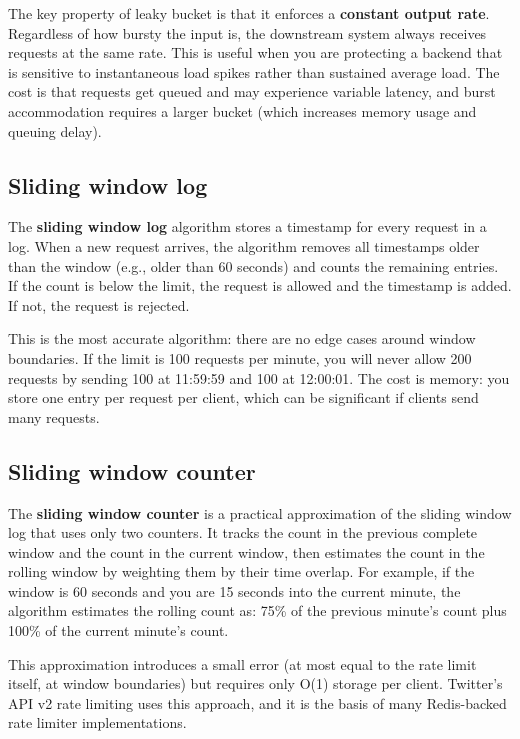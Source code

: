 \documentclass[11pt,a4paper]{article}
\begin{document}
The key property of leaky bucket is that it enforces a \textbf{constant output rate}. Regardless of how bursty the input is, the downstream system always receives requests at the same rate. This is useful when you are protecting a backend that is sensitive to instantaneous load spikes rather than sustained average load. The cost is that requests get queued and may experience variable latency, and burst accommodation requires a larger bucket (which increases memory usage and queuing delay).

\subsection{Sliding window log}

The \textbf{sliding window log} algorithm stores a timestamp for every request in a log. When a new request arrives, the algorithm removes all timestamps older than the window (e.g., older than 60 seconds) and counts the remaining entries. If the count is below the limit, the request is allowed and the timestamp is added. If not, the request is rejected.

This is the most accurate algorithm: there are no edge cases around window boundaries. If the limit is 100 requests per minute, you will never allow 200 requests by sending 100 at 11:59:59 and 100 at 12:00:01. The cost is memory: you store one entry per request per client, which can be significant if clients send many requests.

\subsection{Sliding window counter}

The \textbf{sliding window counter} is a practical approximation of the sliding window log that uses only two counters. It tracks the count in the previous complete window and the count in the current window, then estimates the count in the rolling window by weighting them by their time overlap. For example, if the window is 60 seconds and you are 15 seconds into the current minute, the algorithm estimates the rolling count as: 75\% of the previous minute's count plus 100\% of the current minute's count.

This approximation introduces a small error (at most equal to the rate limit itself, at window boundaries) but requires only O(1) storage per client. Twitter's API v2 rate limiting uses this approach, and it is the basis of many Redis-backed rate limiter implementations.
\end{document}
